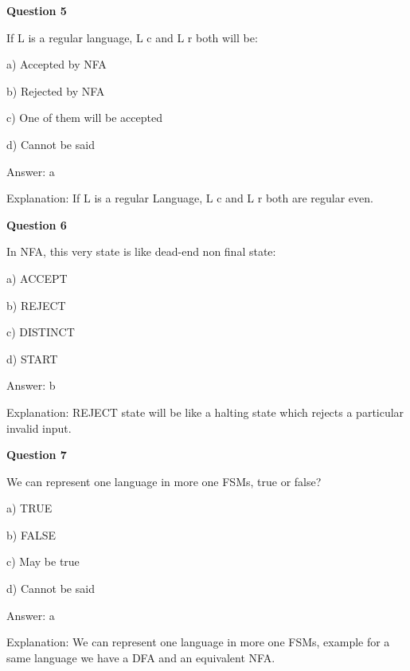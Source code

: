 \documentclass{article}
\begin{document}
\begin{mdframed}[linewidth=1pt, roundcorner=5pt, linecolor=gray!30, backgroundcolor=gray!5]
\textbf{Question 5} 

If L is a regular language, L
c
 and L
r
 both will be:

a) Accepted by NFA

b) Rejected by NFA

c) One of them will be accepted

d) Cannot be said
\vspace{5pt} \par
\begin{tcolorbox}[colback=green!5, colframe=green!40!black, title=Solution]
Answer: a

Explanation: If L is a regular Language, L
c
 and L
r
  both are regular even.
\end{tcolorbox}
\end{mdframed}
\newpage

\begin{mdframed}[linewidth=1pt, roundcorner=5pt, linecolor=gray!30, backgroundcolor=gray!5]
\textbf{Question 6} 

In NFA, this very state is like dead-end non final state:

a) ACCEPT

b) REJECT

c) DISTINCT

d) START
\vspace{5pt} \par
\begin{tcolorbox}[colback=green!5, colframe=green!40!black, title=Solution]
Answer: b

Explanation: REJECT state will be like a halting state which rejects a particular invalid input.
\end{tcolorbox}
\end{mdframed}

\begin{mdframed}[linewidth=1pt, roundcorner=5pt, linecolor=gray!30, backgroundcolor=gray!5]
\textbf{Question 7} 

We can represent one language in more one FSMs, true or false?

a) TRUE

b) FALSE

c) May be true

d) Cannot be said
\vspace{5pt} \par
\begin{tcolorbox}[colback=green!5, colframe=green!40!black, title=Solution]
Answer: a

Explanation: We can represent one language in more one FSMs, example for a same language we have a DFA and an equivalent NFA.
\end{tcolorbox}
\end{mdframed}
\end{document}
